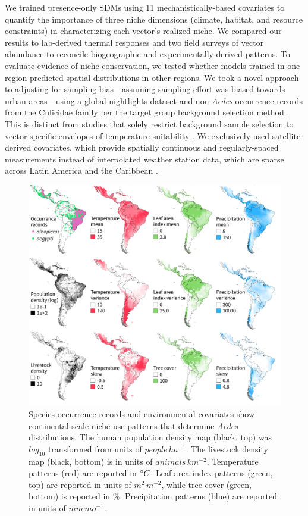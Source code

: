 \noindent We trained presence-only SDMs using 11 mechanistically-based covariates to quantify the importance of three niche dimensions (climate, habitat, and resource constraints) in characterizing each vector’s realized niche. We compared our results to lab-derived thermal responses and two field surveys of vector abundance to reconcile biogeographic and experimentally-derived patterns. To evaluate evidence of niche conservation, we tested whether models trained in one region predicted spatial distributions in other regions. We took a novel approach to adjusting for sampling bias—assuming sampling effort was biased towards urban areas—using a global nightlights dataset and non-\textit{Aedes} occurrence records from the Culicidae family per the target group background selection method \cite{Phillips2009-nf, Merow2013-mw}. This is distinct from studies that solely restrict background sample selection to vector-specific envelopes of temperature suitability \cite{Brady2014-ti, Kraemer2015-ct}. We exclusively used satellite-derived covariates, which provide spatially continuous and regularly-spaced measurements instead of interpolated weather station data, which are sparse across Latin America and the Caribbean \cite{Fick2017-am}.

\begin{figure}[!ht]
\includegraphics[width=\textwidth]{figures/ch3-map-covariates.pdf}
\centering
\caption[Species occurrence records and environmental covariates show continental-scale niche use patterns that determine \textit{Aedes} distributions.]{Species occurrence records and environmental covariates show continental-scale niche use patterns that determine \textit{Aedes} distributions. The human population density map (black, top) was $log_10$ transformed from units of $people\, ha^{-1}$. The livestock density map (black, bottom) is in units of $animals\, km^{-2}$. Temperature patterns (red) are reported in $\degree C$. Leaf area index patterns (green, top) are reported in units of $m^2\, m^{-2}$, while tree cover (green, bottom) is reported in $\%$. Precipitation patterns (blue) are reported in units of $mm\, mo^{-1}$.}
\label{fig:map-covariates}
\end{figure}

